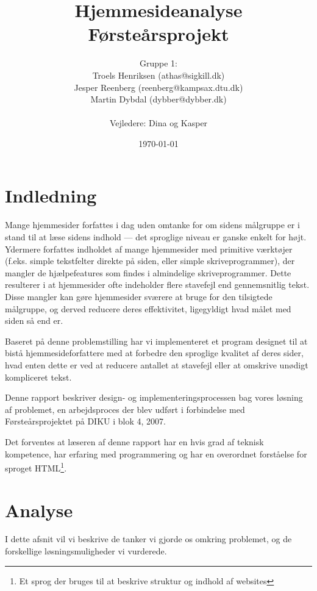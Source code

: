 \documentclass[a4paper,oneside,article]{memoir}
\title{Hjemmesideanalyse  \\ \small{Førsteårsprojekt}}
\author
{
  Gruppe 1:\\
  Troels Henriksen (athas@sigkill.dk)\\
  Jesper Reenberg (reenberg@kampsax.dtu.dk)\\
  Martin Dybdal (dybber@dybber.dk)\\ \\
  Vejledere: Dina og Kasper
}
\date{\today}
\begin{document}
\maketitle
\newpage
\tableofcontents*
\newpage

\chapter{Indledning}
\label{indledning}
Mange hjemmesider forfattes i dag uden omtanke for om sidens målgruppe
er i stand til at læse sidens indhold --- det sproglige niveau er
ganske enkelt for højt. Ydermere forfattes indholdet af mange
hjemmesider med primitive værktøjer (f.eks. simple tekstfelter direkte
på siden, eller simple skriveprogrammer), der mangler de
hjælpefeatures som findes i almindelige skriveprogrammer. Dette
resulterer i at hjemmesider ofte indeholder flere stavefejl end
gennemsnitlig tekst. Disse mangler kan gøre hjemmesider sværere at
bruge for den tilsigtede målgruppe, og derved reducere deres
effektivitet, ligegyldigt hvad målet med siden så end er.

Baseret på denne problemstilling har vi implementeret et program
designet til at bistå hjemmesideforfattere med at forbedre den
sproglige kvalitet af deres sider, hvad enten dette er ved at reducere
antallet at stavefejl eller at omskrive unødigt kompliceret tekst.

Denne rapport beskriver design- og implementeringsprocessen bag vores
løsning af problemet, en arbejdsproces der blev udført i forbindelse
med Førsteårsprojektet på DIKU i blok 4, 2007.

Det forventes at læseren af denne rapport har en hvis grad af teknisk
kompetence, har erfaring med programmering og har en overordnet
forståelse for sproget HTML\footnote{Et sprog der bruges til at
  beskrive struktur og indhold af websites}.

\chapter{Analyse}

I dette afsnit vil vi beskrive de tanker vi gjorde os omkring
problemet, og de forskellige løsningsmuligheder vi vurderede.
\end{document}
